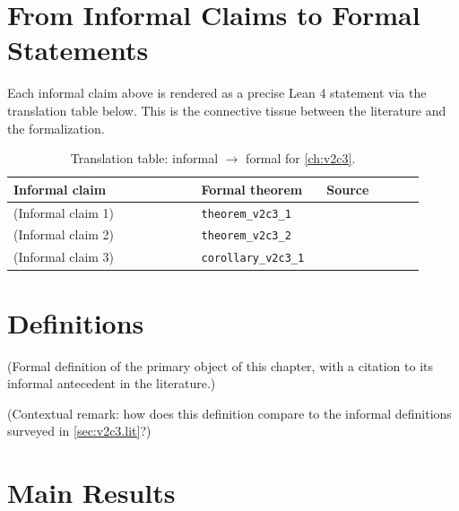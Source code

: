         \section{From Informal Claims to Formal Statements}
        \label{sec:v2c3.bridge}

        Each informal claim above is rendered as a precise Lean 4 statement
        via the translation table below.  This is the connective tissue
        between the literature and the formalization.

        \begin{table}[ht]
        \centering
        \begin{tabular}{p{0.42\linewidth} p{0.28\linewidth} p{0.22\linewidth}}
        \toprule
        \textbf{Informal claim} & \textbf{Formal theorem} & \textbf{Source} \\
        \midrule
        (Informal claim 1) & \texttt{theorem\_v2c3\_1} & \cite{lean4_tpil} \\
        (Informal claim 2) & \texttt{theorem\_v2c3\_2} & \cite{mathlib4} \\
        (Informal claim 3) & \texttt{corollary\_v2c3\_1} & \cite{mac_lane_1998} \\
        \bottomrule
        \end{tabular}
        \caption{Translation table: informal $\rightarrow$ formal for
        \cref{ch:v2c3}.}
        \label{tab:v2c3.bridge}
        \end{table}

        \section{Definitions}

        \begin{definition}
        \label{def:v2c3.1}
          (Formal definition of the primary object of this chapter, with
          a citation to its informal antecedent in the literature.)
        \end{definition}

        \begin{remark}
          (Contextual remark: how does this definition compare to the
          informal definitions surveyed in
          \cref{sec:v2c3.lit}?)
        \end{remark}

        \section{Main Results}

